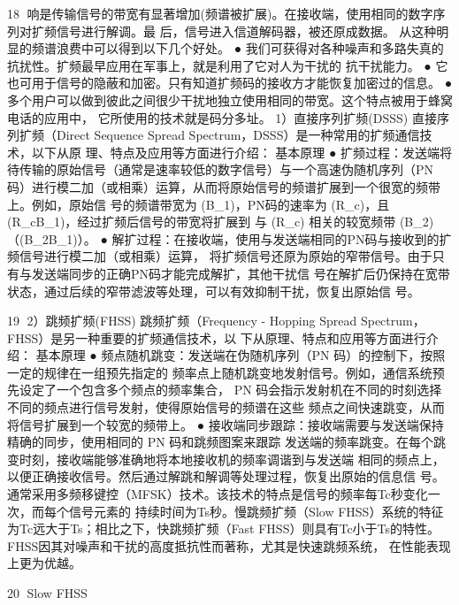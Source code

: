                                                         18
响是传输信号的带宽有显著增加(频谱被扩展)。在接收端，使用相同的数字序列对扩频信号进行解调。最
后，信号进入信道解码器，被还原成数据。
从这种明显的频谱浪费中可以得到以下几个好处。
 ● 我们可获得对各种噪声和多路失真的抗扰性。扩频最早应用在军事上，就是利用了它对人为干扰的
   抗干扰能力。
 ● 它也可用于信号的隐蔽和加密。只有知道扩频码的接收方才能恢复加密过的信息。
 ● 多个用户可以做到彼此之间很少干扰地独立使用相同的带宽。这个特点被用于蜂窝电话的应用中，
   它所使用的技术就是码分多址。
1）直接序列扩频(DSSS)
直接序列扩频（Direct Sequence Spread Spectrum，DSSS）是一种常用的扩频通信技术，以下从原
理、特点及应用等方面进行介绍：
基本原理
 ● 扩频过程：发送端将待传输的原始信号（通常是速率较低的数字信号）与一个高速伪随机序列（PN
   码）进行模二加（或相乘）运算，从而将原始信号的频谱扩展到一个很宽的频带上。例如，原始信
   号的频谱带宽为 (B_1)，PN码的速率为 (R_c)，且 (R_c\gg B_1)，经过扩频后信号的带宽将扩展到
   与 (R_c) 相关的较宽频带 (B_2)（(B_2\gg B_1)）。
 ● 解扩过程：在接收端，使用与发送端相同的PN码与接收到的扩频信号进行模二加（或相乘）运算，
   将扩频信号还原为原始的窄带信号。由于只有与发送端同步的正确PN码才能完成解扩，其他干扰信
   号在解扩后仍保持在宽带状态，通过后续的窄带滤波等处理，可以有效抑制干扰，恢复出原始信
   号。




                                                            19
2）跳频扩频(FHSS)
跳频扩频（Frequency - Hopping Spread Spectrum，FHSS）是另一种重要的扩频通信技术，以
下从原理、特点和应用等方面进行介绍：
基本原理
 ● 频点随机跳变：发送端在伪随机序列（PN 码）的控制下，按照一定的规律在一组预先指定的
   频率点上随机跳变地发射信号。例如，通信系统预先设定了一个包含多个频点的频率集合，
   PN 码会指示发射机在不同的时刻选择不同的频点进行信号发射，使得原始信号的频谱在这些
   频点之间快速跳变，从而将信号扩展到一个较宽的频带上。
 ● 接收端同步跟踪：接收端需要与发送端保持精确的同步，使用相同的 PN 码和跳频图案来跟踪
   发送端的频率跳变。在每个跳变时刻，接收端能够准确地将本地接收机的频率调谐到与发送端
   相同的频点上，以便正确接收信号。然后通过解跳和解调等处理过程，恢复出原始的信息信
   号。
通常采用多频移键控（MFSK）技术。该技术的特点是信号的频率每Tc秒变化一次，而每个信号元素的
持续时间为Ts秒。慢跳频扩频（Slow FHSS）系统的特征为Tc远大于Ts；相比之下，快跳频扩频（Fast
FHSS）则具有Tc小于Ts的特性。FHSS因其对噪声和干扰的高度抵抗性而著称，尤其是快速跳频系统，
在性能表现上更为优越。


                                                           20
Slow FHSS




